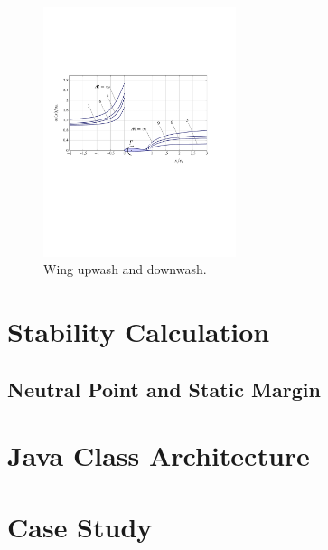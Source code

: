 \begin{figure}[H]
\centering
\includegraphics[height=7.3cm]{Immagini/wing_up-downwash}
\caption{Wing upwash and downwash.}
\label{wingud}
\end{figure}



\section{Stability Calculation}
\subsection{Neutral Point and Static Margin}





\section{Java Class Architecture}
 
\section{Case Study}